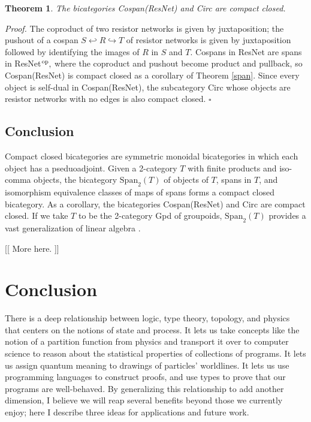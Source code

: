 \documentclass[12pt,twoside,openright]{report}
\newtheorem{thm}{Theorem}
\newcommand{\op}{{\rm op}}
\newcommand{\Span}{\mbox{Span}}
\begin{document}
\begin{thm}
  The bicategories Cospan(ResNet) and Circ are compact closed.
\end{thm}
{\em Proof.} The coproduct of two resistor networks is given by juxtaposition; the pushout of a cospan $S \hookleftarrow R
\hookrightarrow T$ of resistor networks is given by juxtaposition followed by identifying the images of $R$ in $S$ and $T$.  Cospans in ResNet are spans in ResNet${}^{\op},$ where the coproduct and pushout become product and pullback, so Cospan(ResNet) is compact closed as a corollary of Theorem \ref{span}.  Since every object is self-dual in Cospan(ResNet), the subcategory Circ whose objects are resistor networks with no edges is also compact closed. \hfill $\square$

\section{Conclusion}

Compact closed bicategories are symmetric monoidal bicategories in which each object has a pseduoadjoint.  Given a 2-category $T$ with finite products and iso-comma objects, the bicategory $\Span_2(T)$ of objects of $T$, spans in $T$, and isomorphism equivalence classes of maps of spans forms a compact closed bicategory.  As a corollary, the bicategories Cospan(ResNet) and Circ are compact closed.  If we take $T$ to be the 2-category Gpd of groupoids, $\Span_2(T)$ provides a vast generalization of linear algebra \cite{Gpdify}.

[[ More here. ]]

\chapter*{Conclusion}

There is a deep relationship between logic, type theory, topology, and physics that centers on the notions of state and process.  It lets us take concepts like the notion of a partition function from physics and transport it over to computer science to reason about the statistical properties of collections of programs.  It lets us assign quantum meaning to drawings of particles' worldlines.  It lets us use programming languages to construct proofs, and use types to prove that our programs are well-behaved.  By generalizing this relationship to add another dimension, I believe we will reap several benefits beyond those we currently enjoy; here I describe three ideas for applications and future work.
\end{document}
